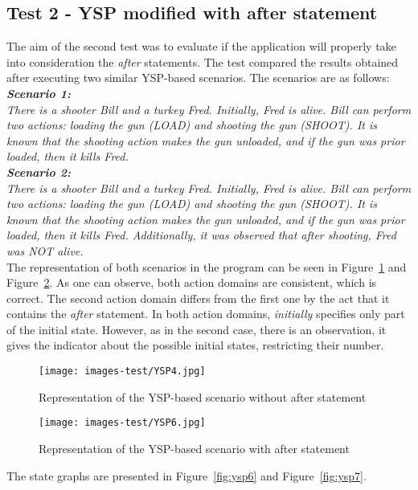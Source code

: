 \documentclass[a4paper]{article}
\begin{document}
\subsection{Test 2 - YSP modified with after statement}
%
The aim of the second test was to evaluate if the application will properly take into consideration the \textit{after} statements. The test compared the results obtained after executing two similar YSP-based scenarios. The scenarios are as follows:
\\[0.5\baselineskip]
\textbf{\textit{Scenario 1:}} \\
\textit{There is a shooter Bill and a turkey Fred. Initially, Fred is alive. Bill can perform two actions: loading the gun (LOAD) and shooting the gun (SHOOT). It is known that the shooting action makes the gun unloaded, and if the gun was prior loaded, then it kills Fred.} \\[0.5\baselineskip]
\textbf{\textit{Scenario 2:}} \\
\textit{There is a shooter Bill and a turkey Fred. Initially, Fred is alive. Bill can perform two actions: loading the gun (LOAD) and shooting the gun (SHOOT). It is known that the shooting action makes the gun unloaded, and if the gun was prior loaded, then it kills Fred. Additionally, it was observed that after shooting, Fred was NOT alive.} \\[0.5\baselineskip]
The representation of both scenarios in the program can be seen in Figure~\ref{fig:ysp4} and Figure~\ref{fig:ysp5}. As one can observe, both action domains are consistent, which is correct. The second action domain differs from the first one by the act that it contains the \textit{after} statement. In both action domains, \textit{initially} specifies only part of the initial state. However, as in the second case, there is an observation, it gives the indicator about the possible initial states, restricting their number. 
\begin{figure}[htp]
    \centering
    \texttt{[image: images-test/YSP4.jpg]}
    \caption{Representation of the YSP-based scenario without after statement}
    \label{fig:ysp4}
\end{figure}
\begin{figure}[htp]
    \centering
    \texttt{[image: images-test/YSP6.jpg]}
    \caption{Representation of the YSP-based scenario with after statement}
    \label{fig:ysp5}
\end{figure}
The state graphs are presented in Figure~\ref{fig:ysp6} and Figure~\ref{fig:ysp7}.
\end{document}
